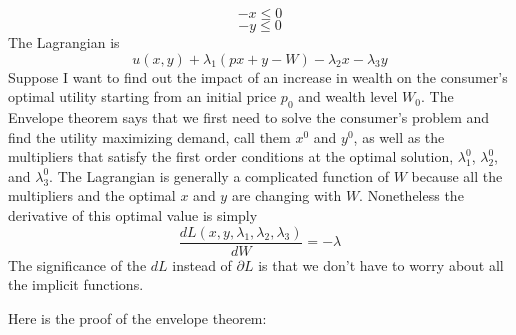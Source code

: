 \documentclass[12pt]{article}
\begin{document}
\[ - x \leqslant 0 \]
\[ - y \leqslant 0 \]
The Lagrangian is
\[ u ( x, y ) + \lambda_1 ( p x + y - W ) - \lambda_2 x - \lambda_3 y \]
Suppose I want to find out the impact of an increase in wealth on the
consumer's optimal utility starting from an initial price $p_0$ and wealth
level $W_0$. The Envelope theorem says that we first need to solve the
consumer's problem and find the utility maximizing demand, call them $x^0$ and
$y^0$, as well as the multipliers that satisfy the first order conditions at
the optimal solution, $\lambda^0_1$, $\lambda^0_2$, and $\lambda^0_3$. The
Lagrangian is generally a complicated function of $W$ because all the
multipliers and the optimal $x$ and $y$ are changing with $W$. Nonetheless the
derivative of this optimal value is simply
\[ \frac{d L ( x, y, \lambda_1, \lambda_2, \lambda_3 )}{d W} = - \lambda \]
The significance of the $d L$ instead of $\partial L$ is that we don't have to
worry about all the implicit functions.

Here is the proof of the envelope theorem:
\end{document}
